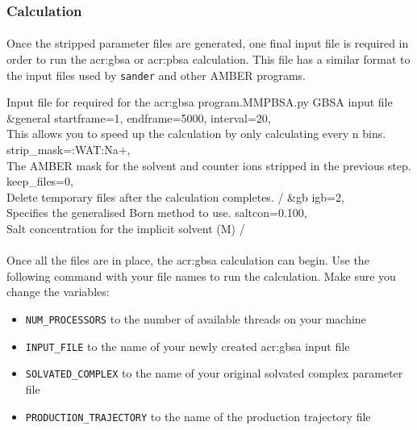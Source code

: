     \subsubsection{Calculation}
    \paragraph{}
    Once the stripped parameter files are generated, one final input file is required in order to run the \gls{acr:gbsa} or \gls{acr:pbsa} calculation. This file has a similar format to the input files used by \texttt{sander} and other AMBER programs.

    \begin{inpfile}[label=file:pbsa]{Input file for required for the \gls{acr:gbsa} program.}{MMPBSA.py}
GBSA input file
&general
    startframe=1, endframe=5000, interval=20, \\ This allows you to speed up the calculation by only calculating every n bins.
    strip_mask=:WAT:Na+, \\ The AMBER mask for the solvent and counter ions stripped in the previous step.
    keep_files=0, \\ Delete temporary files after the calculation completes.
/
&gb
    igb=2, \\ Specifies the generalised Born method to use.
    saltcon=0.100, \\ Salt concentration for the implicit solvent (M)
/
    \end{inpfile}

    \paragraph{}
    Once all the files are in place, the \gls{acr:gbsa} calculation can begin. Use the following command with your file names to run the calculation. Make sure you change the variables: 
    \begin{itemize}
        \item \texttt{NUM\_PROCESSORS} to the number of available threads on your machine
        \item \texttt{INPUT\_FILE} to the name of your newly created \gls{acr:gbsa} input file
        \item \texttt{SOLVATED\_COMPLEX} to the name of your original solvated complex parameter file
        \item \texttt{PRODUCTION\_TRAJECTORY} to the name of the production trajectory file
    \end{itemize}

